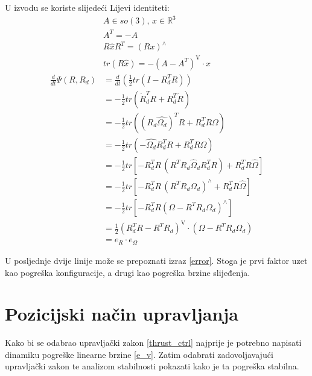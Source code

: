 \documentclass[times, utf8, diplomski, numeric]{fer}
\begin{document}
	U izvodu se koriste slijedeći Lijevi identiteti:
	\begin{gather}
		A\in so(3), \,  x\in\mathbb{R}^3 \\
		A^T = -A \\
		R \hat{x}R^T = (Rx)^\wedge \\
		tr(R\hat{x}) = - (A - A^T)^\text{V} \cdot x
	\end{gather}
	\begin{align*}
		\frac{d}{dt}\Psi(R, R_d) &= \frac{d}{dt} ( \frac{1}{2} tr(I - R_d^TR)) \\
		&= - \frac{1}{2}tr(\dot{R}_d^TR + R_d^T\dot{R}) \\
		&= - \frac{1}{2}tr( (R_d \hat{\Omega_d})^TR + R_d^TR\Omega ) \\
		&=  - \frac{1}{2}tr( -\hat{\Omega_d}R_d^TR + R_d^TR\hat{\Omega}) \\
		&= - \frac{1}{2}tr[ -R_d^TR \, (R^TR_d\hat{\Omega}_dR_d^TR) + R_d^TR\hat{\Omega} ] \\
		&=  - \frac{1}{2}tr[ -R_d^TR \, (R^TR_d\Omega_d)^\wedge + R_d^TR\hat{\Omega} ] \\
		&= - \frac{1}{2}tr[ -R_d^TR (\Omega - R^TR_d\Omega_d)^\wedge ] \\
		&= \frac{1}{2}(R_d^TR - R^TR_d)^\text{V} \cdot (\Omega - R^TR_d\Omega_d) \\
		&= e_R \cdot e_\Omega
	\end{align*}
	
	U posljednje dvije linije može se prepoznati izraz \ref{error}. Stoga je prvi faktor uzet kao pogreška konfiguracije, a drugi kao pogreška brzine slijeđenja.
	
	\newpage
	\clearpage
	
	\section{Pozicijski način upravljanja}
	Kako bi se odabrao upravljački zakon \ref{thrust_ctrl} najprije je potrebno napisati dinamiku pogreške linearne brzine \ref{e_v}. Zatim odabrati zadovoljavajući upravljački zakon te analizom stabilnosti pokazati kako je ta pogreška stabilna.
	
\end{document}

